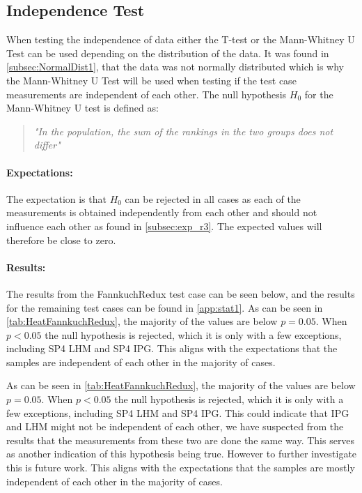 

\subsection{Independence Test}\label{subsec:independence1}

When testing the independence of data either the T-test or the Mann-Whitney U Test can be used depending on the distribution of the data. It was found in \cref{subsec:NormalDist1}, that the data was not normally distributed which is why the Mann-Whitney U Test will be used when testing if the test case measurements are independent of each other. The null hypothesis $H_0$ for the Mann-Whitney U test is defined as:

\begin{quote}
    \textit{"In the population, the sum of the rankings in the two groups does not differ"}\cite[]{mann1947test}
\end{quote}

\paragraph{Expectations:} The expectation is that $H_0$ can be rejected in all cases as each of the measurements is obtained independently from each other and should not influence each other as found in \cref{subsec:exp_r3}. The expected values will therefore be close to zero.

\paragraph{Results:}
The results from the FannkuchRedux test case can be seen below, and the results for the remaining test cases can be found in \cref{app:stat1}. As can be seen in \cref{tab:HeatFannkuchRedux}, the majority of the values are below $p = 0.05$. When $p < 0.05$ the null hypothesis is rejected, which it is only with a few exceptions, including SP4 LHM and SP4 IPG. This aligns with the expectations that the samples are independent of each other in the majority of cases.

 

As can be seen in \cref{tab:HeatFannkuchRedux}, the majority of the values are below $p = 0.05$. When $p < 0.05$ the null hypothesis is rejected, which it is only with a few exceptions, including SP4 LHM and SP4 IPG. This could indicate that IPG and LHM might not be independent of each other, we have suspected from the results that the measurements from these two are done the same way. This serves as another indication of this hypothesis being true. However to further investigate this is future work.
This aligns with the expectations that the samples are mostly independent of each other in the majority of cases.

